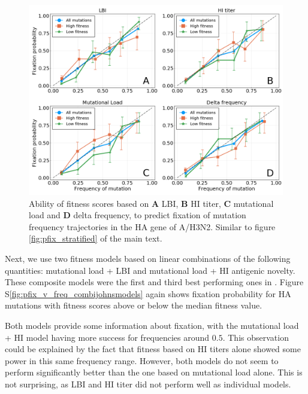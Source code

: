 \documentclass[reprint,amsmath,amssymb,superscriptaddress,showpacs,rmp]{revtex4-1}
\newcommand{\sref}[1]{S\ref{#1}}
\begin{document}
\begin{figure}
	\centering
	\includegraphics[scale=0.5]{Rev_figures/pfix_v_freq_indivJohnsmodels.png}
	\caption{Ability of fitness scores based on \textbf{A} LBI, \textbf{B} HI titer, \textbf{C} mutational load and \textbf{D} delta frequency, to predict fixation of mutation frequency trajectories in the HA gene of A/H3N2. Similar to figure \ref{fig:pfix_stratified} of the main text.}
	\label{fig:pfix_v_freq_indivjohnsmodels}
\end{figure}

Next, we use two fitness models based on linear combinations of the following quantities: mutational load + LBI and mutational load + HI antigenic novelty.
These composite models were the first and third best performing ones in \citep{huddleston_integrating_2020}.
Figure \sref{fig:pfix_v_freq_combijohnsmodels} again shows fixation probability for HA mutations with fitness scores above or below the median fitness value.

Both models provide some information about fixation, with the mutational load + HI model having more success for frequencies around $0.5$.
This observation could be explained by the fact that fitness based on HI titers alone showed some power in this same frequency range.
However, both models do not seem to perform significantly better than the one based on mutational load alone.
This is not surprising, as LBI and HI titer did not perform well as individual models.
\end{document}
